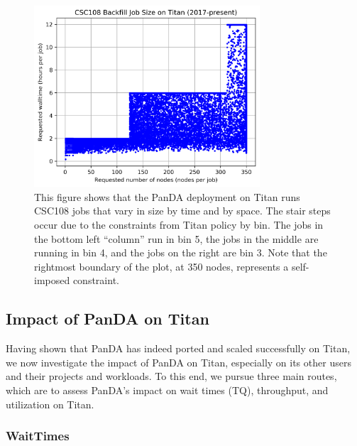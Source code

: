 \begin{figure}
  \includegraphics[width=0.75\textwidth]{images/time-vs-nodes-backfill.png}
\caption{This figure shows that the PanDA deployment on Titan runs CSC108 jobs
that vary in size by time and by space. The stair steps occur due to the
constraints from Titan policy by bin. The jobs in the bottom left ``column''
run in bin 5, the jobs in the middle are running in bin 4, and the jobs on the
right are bin 3. Note that the rightmost boundary of the plot, at 350 nodes,
represents a self-imposed constraint.}
\label{fig:time-vs-nodes}
\end{figure}






\subsection{Impact of PanDA on Titan}
\label{subsec:impact}

Having shown that PanDA has indeed ported and scaled successfully on Titan, we
now investigate the impact of PanDA on Titan, especially on its other users
and their projects and workloads. To this end, we pursue three main routes,
which are to assess PanDA's impact on wait times (TQ), throughput, and
utilization on Titan.




\subsubsection{WaitTimes}
\label{subsubsec:waittimes}

